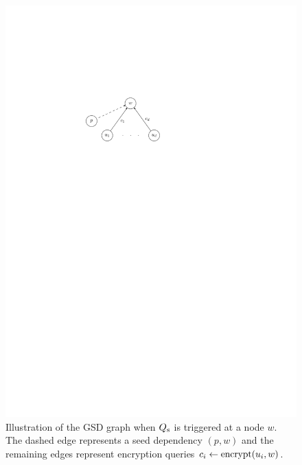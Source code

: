 \begin{figure}
	\begin{center}
		\includegraphics{figures/gsd-qs-triggered}
	\end{center}
	\caption{Illustration of the GSD graph when $Q_\mathrm{s}$ is triggered at a node $w$. The dashed edge represents a seed dependency $(p, w)$ and the remaining edges represent encryption queries $c_i \leftarrow \operatorname{encrypt}(u_i, w)$.}
	\label{fig:gsd-qs-triggered}
\end{figure}


